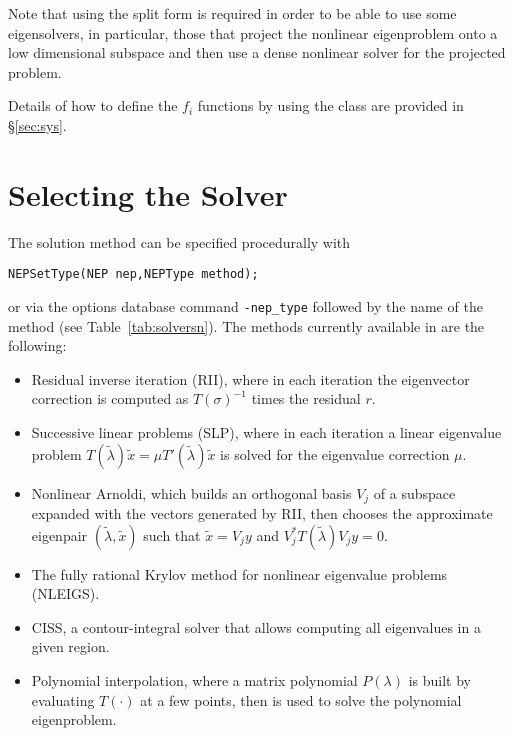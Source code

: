 Note that using the split form is required in order to be able to use some eigensolvers, in particular, those that project the nonlinear eigenproblem onto a low dimensional subspace and then use a dense nonlinear solver for the projected problem.

Details of how to define the $f_i$ functions by using the  class are provided in \S\ref{sec:sys}.

\section{Selecting the Solver}

The solution method can be specified procedurally with
	\begin{Verbatim}[fontsize=\small]
	NEPSetType(NEP nep,NEPType method);
	\end{Verbatim}
or via the options database command \Verb!-nep_type! followed by the name of the method (see Table~\ref{tab:solversn}). The methods currently available in  are the following:
\begin{itemize}
\item Residual inverse iteration (RII), where in each iteration the eigenvector correction is computed as $T(\sigma)^{-1}$ times the residual $r$.
\item Successive linear problems (SLP), where in each iteration a linear eigenvalue problem $T(\tilde\lambda)\tilde x=\mu T'(\tilde\lambda)\tilde x$ is solved for the eigenvalue correction $\mu$.
\item Nonlinear Arnoldi, which builds an orthogonal basis $V_j$ of a subspace expanded with the vectors generated by RII, then chooses the approximate eigenpair $(\tilde\lambda,\tilde x)$ such that $\tilde x=V_jy$ and $V_j^*T(\tilde\lambda)V_jy=0$.
\item The fully rational Krylov method for nonlinear eigenvalue problems (NLEIGS).
\item CISS, a contour-integral solver that allows computing all eigenvalues in a given region.
\item Polynomial interpolation, where a matrix polynomial $P(\lambda)$ is built by evaluating $T(\cdot)$ at a few points, then  is used to solve the polynomial eigenproblem.
\end{itemize}

